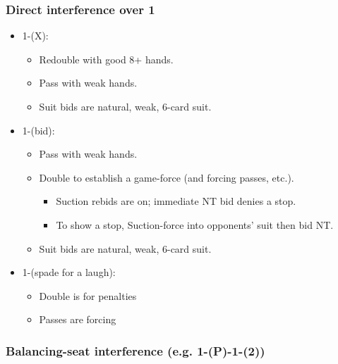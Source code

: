 \documentclass[a4paper,14pt]{extarticle}
\begin{document}
\subsubsection{Direct interference over 1\diamonds}
\label{sec:intf:1d}

\begin{itemize}
\item 1\diamonds-(X):
	\begin{itemize}
   \item Redouble with good 8+ hands.
   \item Pass with weak hands.
   \item Suit bids are natural, weak, 6-card suit.
	\end{itemize}
\item 1\diamonds-(bid):
	\begin{itemize}
   \item Pass with weak hands.
   \item Double to establish a game-force (and forcing passes, etc.).
		\begin{itemize}
      \item Suction rebids are on; immediate NT bid denies a stop.
      \item To show a stop, Suction-force into opponents' suit then bid NT.
		\end{itemize}
   \item Suit bids are natural, weak, 6-card suit.
	\end{itemize}
\item 1\diamonds-(spade for a laugh):
	\begin{itemize}
   \item Double is for penalties
   \item Passes are forcing
	\end{itemize}
\end{itemize}

\subsubsection{Balancing-seat interference (e.g. 1\diamonds-(P)-1\spades-(2\clubs))}
\label{sec:intf:bal}
\end{document}
